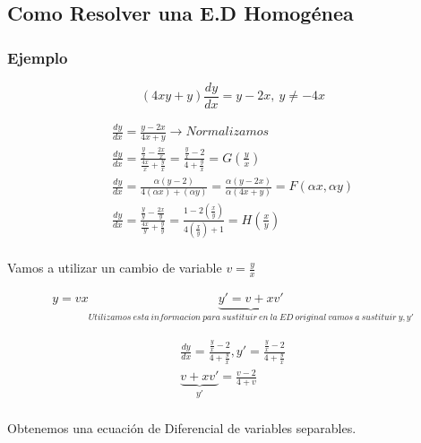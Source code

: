 \documentclass{article}
\begin{document}
\subsection{Como Resolver una E.D Homogénea}

\subsubsection{Ejemplo}
\begin{equation}
\left(4xy +y \right) \frac{dy}{dx} = y-2x, \ y \neq -4x
\end{equation}

\begin{eqnarray}
\nonumber \frac{dy}{dx} = \frac{y-2x}{4x + y} \rightarrow Normalizamos \\
\nonumber \frac{dy}{dx} = \frac{\frac{y}{x}-\frac{2x}{x}}{\frac{4x}{x} + \frac{y}{x}} = \frac{\frac{y}{x}-2}{4 + \frac{y}{x}}  = G \left(\frac{y}{x} \right)  \\
\nonumber \frac{dy}{dx} = \frac{\alpha (y-2)} {4 (\alpha x) + (\alpha y)} = \frac{ \alpha (y-2x) }{\alpha (4x + y)} = F( \alpha x, \alpha y)  \\
\nonumber \frac{dy}{dx} = \frac{\frac{y}{y}-\frac{2x}{y}}{\frac{4x}{y}+ \frac{y}{y}} = \frac{1-2\left( \frac{x}{y} \right)}{4 \left( \frac{x}{y} \right) +1}  = H \left( \frac{x}{y} \right)\\
\end{eqnarray}

Vamos a utilizar un cambio de variable $v = \frac{y}{x}$

\begin{eqnarray}
\nonumber y = vx
\nonumber  \underbrace{y'= v + xv'}_{Utilizamos \ esta \ informacion \ para \  sustituir \ en \ la \ ED \ original \ vamos \ a \ sustituir \ y,y'} 
\end{eqnarray}

\begin{eqnarray}
\nonumber \frac{dy}{dx} = \frac{\frac{y}{x} - 2}{4+ \frac{y}{x}} ,  y' = \frac{\frac{y}{x}-2}{4+ \frac{y}{x}} \\
\nonumber \underbrace{v + xv'}_{y'} = \frac{v - 2}{ 4 + v} \\
\end{eqnarray}

Obtenemos una ecuación de Diferencial de variables separables.
\end{document}

